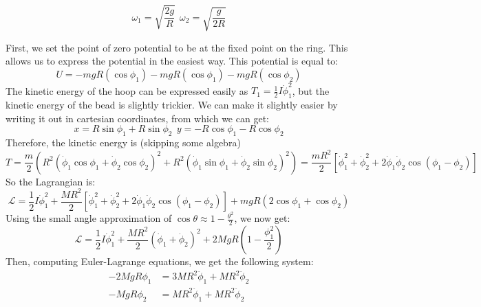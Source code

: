 \documentclass[10pt]{article}
\begin{document}
	\[
	\omega_1 = \sqrt{\frac{2g}{R}} \ \ \omega_2 = \sqrt{\frac{g}{2R}} 
	\]
	\begin{solution}
		First, we set the point of zero potential to be at the fixed point on the ring. This allows us to 
		express the potential in the easiest way. This potential is equal to: 
		\[
		U = -mgR(\cos \phi_1) - mgR(\cos \phi_1) - mgR(\cos \phi_2)
		\] 
		The kinetic energy of the hoop can be expressed easily as $T_1 = \frac{1}{2}I \dot \phi_1^2$, but the 
		kinetic energy of the bead is slightly trickier. We can make it slightly easier by writing it out in 
		cartesian coordinates, from which we can get:
		\[
		x = R \sin \phi_1 + R \sin \phi_2\ \ y = -R \cos \phi_1 - R \cos \phi_2
		\] 
		Therefore, the kinetic energy is (skipping some algebra)
		\[
		T = \frac{m}{2}(R^2(\dot \phi_1 \cos \phi_1 + \dot \phi_2 \cos \phi_2)^2 + R^2(\dot \phi_1 \sin \phi_1 + 
		\dot \phi_2 \sin \phi_2)^2) = \frac{mR^2}{2}\left[\dot \phi_1^2 + \dot \phi_2^2 + 2 \dot \phi_1 \dot 
		\phi_2 \cos(\phi_1 - \phi_2)\right] 
		\] 
		So the Lagrangian is: 
		\[
		\mathcal L = \frac{1}{2}I\dot \phi_1^2 + \frac{MR^2}{2}\left[\dot \phi_1^2 + \dot \phi_2^2 + 2\dot \phi_1
		\dot \phi_2 \cos(\phi_1 - \phi_2)\right] + mgR(2 \cos \phi_1 + \cos \phi_2)
		\] 
		Using the small angle approximation of $\cos \theta \approx 1 - \frac{\theta^2}{2}$, we now get: 
		\[
		\mathcal L = \frac{1}{2}I \dot \phi_1^2  + \frac{MR^2}{2}(\dot \phi_1 + \dot \phi_2)^2 + 2MgR(1 - 
		\frac{\phi_1^2}{2})
		\] 
		Then, computing Euler-Lagrange equations, we get the following system: 
		\begin{align*}
			-2MgR\phi_1 &= 3MR^2\ddot \phi_1 + MR^2 \ddot \phi_2 \\
			-MgR\phi_2 &= MR^2 \ddot \phi_1 + MR^2 \ddot \phi_2
		\end{align*}


\end{solution}
\end{document}
